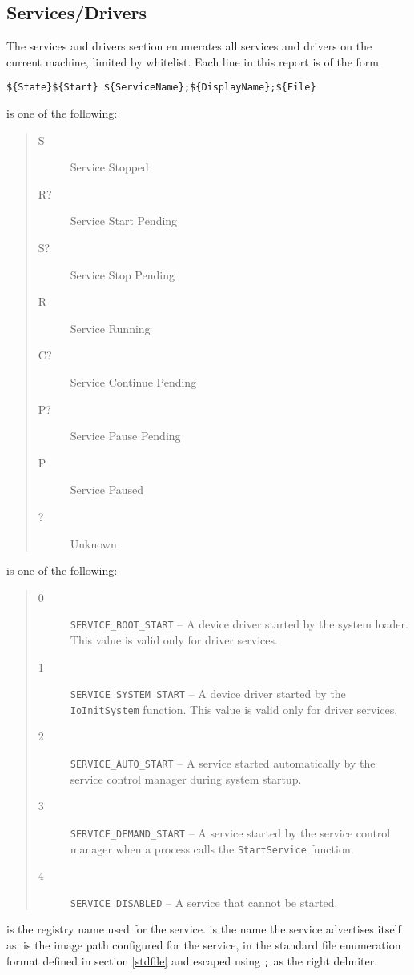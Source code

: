 \subsection{Services/Drivers}
The services and drivers section enumerates all services and drivers on the
current machine, limited by whitelist. Each line in this report is of the form
\begin{verbatim}
${State}${Start} ${ServiceName};${DisplayName};${File}
\end{verbatim}

\noindent{} is one of the following:
\begin{quote}
\begin{description}
\item[S] Service Stopped
\item[R?] Service Start Pending
\item[S?] Service Stop Pending
\item[R] Service Running
\item[C?] Service Continue Pending
\item[P?] Service Pause Pending
\item[P] Service Paused
\item[?] Unknown
\end{description}
\end{quote}

\noindent{} is one of the following:
\begin{quote}
\begin{description}
\item[0] \verb|SERVICE_BOOT_START| -- A device driver started by the system
loader. This value is valid only for driver services.
\item[1] \verb|SERVICE_SYSTEM_START| -- A device driver started by the
\verb|IoInitSystem| function. This value is valid only for driver services.
\item[2] \verb|SERVICE_AUTO_START| -- A service started automatically by the
service control manager during system startup.
\item[3] \verb|SERVICE_DEMAND_START| -- A service started by the service control
manager when a process calls the \verb|StartService| function.
\item[4] \verb|SERVICE_DISABLED| -- A service that cannot be started.
\end{description}
\end{quote}

 is the registry name used for the service. 
is the name the service advertises itself as.  is the image path
configured for the service, in the standard file enumeration format defined in
section \ref{stdfile} and escaped using \verb|;| as the right delmiter.


